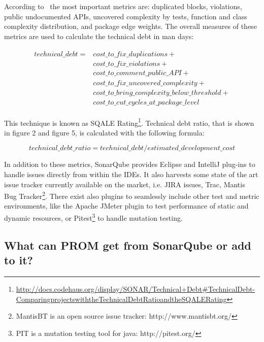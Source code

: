 According to~\cite{Gallaba} the most important metrics are: duplicated blocks, violations,
public undocumented APIs, uncovered complexity by tests, function and class
complexity distribution, and package edge weights.
The overall measures of these metrics are used to calculate the technical debt
in man days:

\begin{align}
\begin{split}
\label{Technical debt in man days}
technical\_debt = & cost\_to\_fix\_duplications + \\
  	& cost\_to\_fix\_violations + \\
  	& cost\_to\_comment\_public\_API + \\
  	& cost\_to\_fix\_uncovered\_complexity + 	\\
  	& cost\_to\_bring\_complexity\_below\_threshold +\\
  	& cost\_to\_cut\_cycles\_at\_package\_level
\end{split}
\end{align}

This technique is known as SQALE Rating\footnote{\url{http://docs.codehaus.org/display/SONAR/Technical+Debt#TechnicalDebt-ComparingprojectswiththeTechnicalDebtRatioandtheSQALERating}}. Technical debt ratio, that is shown in
figure 2 and figure 5, is calculated with the following formula:

\begin{equation}
\label{Technical Debt Ratio}
technical\_debt\_ratio = technical\_debt / estimated\_development\_cost
\end{equation}


In addition to these metrics, SonarQube provides Eclipse and IntelliJ plug-ins to
handle issues directly from within the IDEs. It also harvests some state of the
art issue tracker currently available on the market, i.e. JIRA issues, Trac,
Mantis Bug Tracker\footnote{MantisBT is an open source issue tracker:
http://www.mantisbt.org/}. There exist also plugins to seamlessly include other
test and metric environments, like the Apache JMeter
plugin\cite{http://docs.codehaus.org/display/SONAR/JMeter+Plugin} to test
performance of
static and dynamic resources, or Pitest\footnote{PIT is a mutation testing tool for
java: http://pitest.org/} to handle mutation testing.

\subsection{What can PROM get from SonarQube or add to it?}

